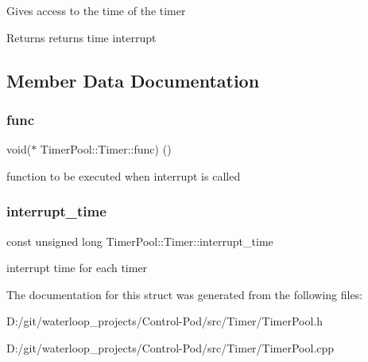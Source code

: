 Gives access to the time of the timer \begin{DoxyReturn}{Returns}
returns time interrupt 
\end{DoxyReturn}


\subsection{Member Data Documentation}
\mbox{\label{struct_timer_pool_1_1_timer_ac6b965c4aaf19b503c90fa4a4aaecf33}} 
\subsubsection{\texorpdfstring{func}{func}}
{\footnotesize\ttfamily void($\ast$ Timer\+Pool\+::\+Timer\+::func) ()\hspace{0.3cm}{\ttfamily [private]}}

function to be executed when interrupt is called \mbox{\label{struct_timer_pool_1_1_timer_a65c0f3c6fba122f53a7debf9d337eb81}} 
\subsubsection{\texorpdfstring{interrupt\+\_\+time}{interrupt\_time}}
{\footnotesize\ttfamily const unsigned long Timer\+Pool\+::\+Timer\+::interrupt\+\_\+time\hspace{0.3cm}{\ttfamily [private]}}

interrupt time for each timer 

The documentation for this struct was generated from the following files\+:\begin{DoxyCompactItemize}
\item 
D\+:/git/waterloop\+\_\+projects/\+Control-\/\+Pod/src/\+Timer/Timer\+Pool.\+h\item 
D\+:/git/waterloop\+\_\+projects/\+Control-\/\+Pod/src/\+Timer/Timer\+Pool.\+cpp\end{DoxyCompactItemize}
